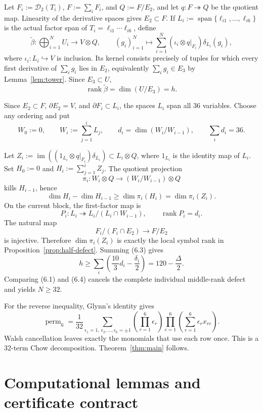 \documentclass[11pt]{amsart}
\newcommand{\Span}{\operatorname{span}}
\newcommand{\im}{\operatorname{im}}
\newcommand{\rank}{\operatorname{rank}}
\newcommand{\perm}{\operatorname{perm}}
\newcommand{\cD}{\mathcal{D}}
\theoremstyle{definition}
\begin{document}
Let \(F_i:=\cD_2(T_i)\), \(F:=\sum_iF_i\), and \(Q:=F/E_2\), and let
\(q:F\twoheadrightarrow Q\) be the quotient map. Linearity of the
derivative spaces gives \(E_2\subset F\). If
\(L_i:=\Span\{\ell_{i1},\ldots,\ell_{i6}\}\) is the actual factor span of
\(T_i=\ell_{i1}\cdots\ell_{i6}\), define
\[
 \widetilde\beta:\bigoplus_{i=1}^NU_i\longrightarrow V\otimes Q,
 \qquad (g_i)_{i=1}^N\longmapsto
 \sum_{i=1}^N(\iota_i\otimes q|_{F_i})\delta_{L_i}(g_i),
\]
where \(\iota_i:L_i\hookrightarrow V\) is inclusion.
Its kernel consists precisely of tuples for which every first derivative of
\(\sum_i g_i\) lies in \(E_2\), equivalently
\(\sum_i g_i\in E_3\) by Lemma~\ref{lem:tower}. Since \(E_3\subset U\),
\[
 \rank\widetilde\beta=\dim(U/E_3)=h. \tag{6.2}
\]

Since
\(E_2\subset F\), \(\partial E_2=V\), and \(\partial F_i\subset L_i\),
the spaces \(L_i\) span all 36 variables. Choose any ordering and put
\[
 W_0:=0,\qquad W_i:=\sum_{j=1}^iL_j,
 \qquad d_i=\dim(W_i/W_{i-1}),
 \qquad\sum_i d_i=36.
\]

Let
\(Z_i:=\im((1_{L_i}\otimes q|_{F_i})\delta_{L_i})\subset L_i\otimes Q\),
where \(1_{L_i}\) is the identity map of \(L_i\). Set
\(H_0:=0\) and \(H_i:=\sum_{j=1}^iZ_j\). The quotient projection
\[
 \pi_i:W_i\otimes Q\longrightarrow(W_i/W_{i-1})\otimes Q
\]
kills \(H_{i-1}\), hence
\[
 \dim H_i-\dim H_{i-1}\ge\dim\pi_i(H_i)=\dim\pi_i(Z_i). \tag{6.3}
\]
On the current block, the first-factor map is
\[
 P_i:L_i\twoheadrightarrow L_i/(L_i\cap W_{i-1}),
 \qquad\rank P_i=d_i.
\]
The natural map
\[
 F_i/(F_i\cap E_2)\longrightarrow F/E_2
\]
is injective. Therefore \(\dim\pi_i(Z_i)\) is exactly the local symbol rank
in Proposition~\ref{prop:half-defect}. Summing (6.3) gives
\[
 \boxed{h\ge\sum_i\left(\frac{10}{3}d_i-\frac{\delta_i}{2}\right)
 =120-\frac\Delta2.} \tag{6.4}
\]
Comparing (6.1) and (6.4) cancels the complete individual middle-rank defect
and yields \(N\ge32\).

For the reverse inequality, Glynn's identity \cite{Glynn2010} gives
\[
 \perm_6=\frac1{32}
 \sum_{\epsilon_1=1,\ \epsilon_2,\ldots,\epsilon_6=\pm1}
 \left(\prod_{r=1}^6\epsilon_r\right)
 \prod_{c=1}^6\left(\sum_{r=1}^6\epsilon_rx_{rc}\right).
\]
Walsh cancellation leaves exactly the monomials that use each row once. This
is a 32-term Chow decomposition. Theorem~\ref{thm:main} follows.

\section{Computational lemmas and certificate contract}
\label{sec:certificates}
\end{document}
